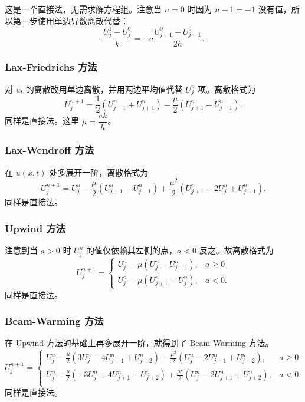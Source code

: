 \documentclass[lang=cn,a4paper,newtx,bibend=bibtex]{elegantpaper}
\begin{document}
这是一个直接法，无需求解方程组。注意当 $n=0$ 时因为 $n-1=-1$ 没有值，所以第一步使用单边导数离散代替：
\begin{equation}
    \frac{U_j^1 - U_j^0}{k} = -a\frac{U_{j+1}^0 - U_{j-1}^0}{2h}.
\end{equation}

\subsubsection{Lax-Friedrichs 方法}

对 $u_t$ 的离散改用单边离散，并用两边平均值代替 $U_j^n$ 项。离散格式为
\begin{equation}
    U_j^{n+1} = \frac 12(U_{j-1}^n + U_{j+1}^n) - \frac {\mu}2(U_{j+1}^n - U_{j-1}^n).
\end{equation}
同样是直接法。这里 $\mu = \dfrac{ak}h$。

\subsubsection{Lax-Wendroff 方法}

在 $u(x,t)$ 处多展开一阶，离散格式为
\begin{equation}
    U_j^{n+1} = U_j^n - \frac {\mu}2(U_{j+1}^n - U_{j-1}^n) + \frac{\mu^2}2(U_{j+1}^n - 2U_j^n + U_{j-1}^n).
\end{equation}
同样是直接法。

\subsubsection{Upwind 方法}

注意到当 $a>0$ 时 $U_j^n$ 的值仅依赖其左侧的点，$a<0$ 反之。故离散格式为
\begin{equation}
    U^{n+1}_j = \left\{
    \begin{aligned}
        U^n_j - \mu(U^n_j - U^n_{j-1}), & a\geq 0\\
        U^n_j - \mu(U^n_{j+1} - U^n_j), & a < 0.
    \end{aligned}
    \right.
\end{equation}
同样是直接法。

\subsubsection{Beam-Warming 方法}

在 Upwind 方法的基础上再多展开一阶，就得到了 Beam-Warming 方法。
\begin{equation}
    U^{n+1}_j = \left\{
    \begin{aligned}
        U^n_j - \frac{\mu}2(3U^n_j - 4U^n_{j-1} + U^n_{j-2}) + \frac{\mu^2}2(U^n_j - 2U_{j-1}^n + U_{j-2}^n), & a\geq 0\\
        U^n_j - \frac{\mu}2(-3U^n_j + 4U^n_{j+1} - U^n_{j+2}) + \frac{\mu^2}2(U^n_j - 2U_{j+1}^n + U_{j+2}^n), & a < 0. \\
    \end{aligned}
    \right.
\end{equation}
同样是直接法。
\end{document}
